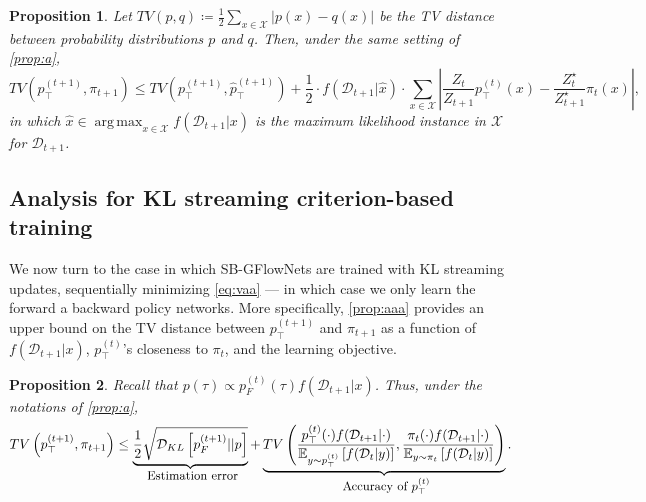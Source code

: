 \documentclass{article}
\DeclareMathOperator*{\argmax}{arg\,max}
\theoremstyle{plain}
\newtheorem{proposition}{Proposition}
\theoremstyle{definition}
\theoremstyle{remark}
\theoremstyle{remark}
\begin{document}
\begin{proposition} \label{prop:aa} 
    Let $TV(p, q) \coloneqq \frac{1}{2} \sum_{x \in \mathcal{X}} |p(x) - q(x)|$ be the TV distance between probability distributions $p$ and $q$. Then, under the same setting of \autoref{prop:a}, 
    \begin{equation*} \label{eq:prop:aa} 
        TV\left(p_{\top}^{(t + 1)}, \pi_{t + 1}\right) \le TV\left(p_{\top}^{(t + 1)}, \hat{p}_{\intercal}^{(t + 1)}\right) +
        \frac{1}{2} \cdot f(\mathcal{D}_{t + 1} | \hat{x}) \cdot \sum_{x \in \mathcal{X}} \left| \frac{Z_{t}}{Z_{t + 1}} p_{\top}^{(t)}(x) - \frac{Z_{t}^{\star}}{Z_{t + 1}^{\star}} \pi_{t}(x) \right|, %
    \end{equation*}
    in which $\hat{x} \in \argmax_{x \in \mathcal{X}} f(\mathcal{D}_{t + 1} | x)$ is the maximum likelihood instance in $\mathcal{X}$ for  $\mathcal{D}_{t + 1}$.
\end{proposition}



\subsection{Analysis for KL streaming criterion-based training} 

We now turn to the case in which SB-GFlowNets are trained with KL streaming updates, sequentially minimizing \autoref{eq:vaa} --- in which case we only learn the forward a backward policy networks. More specifically, \autoref{prop:aaa} provides an upper bound on the TV distance between $p_{\top}^{(t + 1)}$ and $\pi_{t + 1}$ as a function of $f(\mathcal{D}_{t + 1} | x)$, $p_{\top}^{(t)}$'s closeness to $\pi_{t}$, and the learning objective. 

\begin{proposition} \label{prop:aaa} 
     Recall that $p(\tau) \propto p_{F}^{(t)}(\tau) f(\mathcal{D}_{t + 1} | x)$. Thus, under the notations of \autoref{prop:a}, 
    \begin{equation}
        TV\left(p_{\top}^{(t + 1)}, \pi_{t + 1}\right) \le \underbrace{\frac{1}{2} \sqrt{\mathcal{D}_{KL}\left[p_{F}^{(t + 1)} || p \right]}}_{\let\scriptstyle\displaystyle\substack{\text{\small Estimation error}}} + \underbrace{TV\left( \frac{p_{\top}^{(t)}(\cdot) f(\mathcal{D}_{t + 1} | \cdot)}{\mathbb{E}_{y \sim p_{\top}^{(t)}}\left[f(\mathcal{D}_{t} | y)\right]}, \frac{\pi_{t}(\cdot) f(\mathcal{D}_{t + 1} | \cdot)}{\mathbb{E}_{y \sim \pi_t}\left[f(\mathcal{D}_{t} | y)\right]} \right)}_{\let\scriptstyle\displaystyle\substack{\text{\small Accuracy of $p_{\top}^{(t)}$}}}. 
    \end{equation}
\end{proposition}
%  
\end{document}
